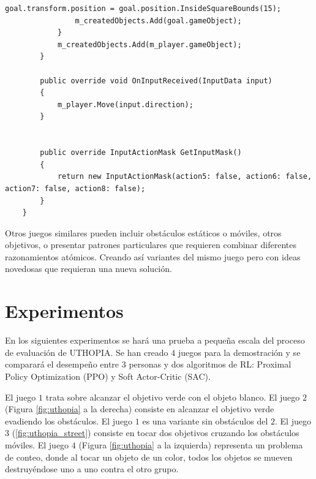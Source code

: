 \begin{lstlisting}[caption={Ejemplo de implementación de un juego que trata sobre un objeto de color blanco que debe tocar al objeto verde.}]
                goal.transform.position = goal.position.InsideSquareBounds(15);
                m_createdObjects.Add(goal.gameObject);
            }
            m_createdObjects.Add(m_player.gameObject);
        }
 
        public override void OnInputReceived(InputData input)
        {
            m_player.Move(input.direction);
        }
 
        
        public override InputActionMask GetInputMask()
        {
            return new InputActionMask(action5: false, action6: false, action7: false, action8: false);
        }
    }
\end{lstlisting}
 
Otros juegos similares pueden incluir obstáculos estáticos o móviles, otros objetivos, o presentar patrones particulares que requieren combinar diferentes razonamientos atómicos. Creando así variantes del mismo juego pero con ideas novedosas que requieran una nueva solución.

\section{Experimentos}
 
En los siguientes experimentos se hará una prueba a pequeña escala del proceso de evaluación de UTHOPIA. Se han creado $4$ juegos para la demostración y se comparará el desempeño entre $3$ personas y dos algoritmos de RL: Proximal Policy Optimization (PPO) y Soft Actor-Critic (SAC).
 
El juego $1$ trata sobre alcanzar el objetivo verde con el objeto blanco. El juego $2$ (Figura \ref{fig:uthopia} a la derecha) consiste en alcanzar el objetivo verde evadiendo los obstáculos. El juego $1$ es una variante sin obstáculos del $2$. El juego $3$ (\ref{fig:uthopia_street}) consiste en tocar dos objetivos cruzando los obstáculos móviles. El juego $4$ (Figura \ref{fig:uthopia} a la izquierda) representa un problema de conteo, donde al tocar un objeto de un color, todos los objetos se mueven destruyéndose uno a uno contra el otro grupo.
 
\vspace*{1cm}
 
